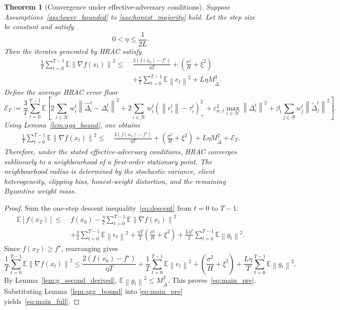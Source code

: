 \documentclass[11pt,a4paper]{article}
\newtheorem{theorem}{Theorem}
\theoremstyle{remark}
\newcommand{\E}{\mathbb{E}}
\newcommand{\HH}{\mathcal{H}}
\newcommand{\BB}{\mathcal{B}}
\newcommand{\norm}[1]{\left\lVert #1 \right\rVert}
\begin{document}
\begin{theorem}[Convergence under effective-adversary conditions]
\label{thm:main}
Suppose Assumptions~\ref{ass:lower_bounded} to \ref{ass:honest_majority} hold.
Let the step size be constant and satisfy
\begin{equation}
    0 < \eta \le \frac{1}{2L}.
    \label{eq:stepsize}
\end{equation}
Then the iterates generated by HRAC satisfy
\begin{align}
    \frac{1}{T}\sum_{t=0}^{T-1}\E\norm{\nabla f(x_t)}^2
    \le\;&
    \frac{2(f(x_0)-f^\star)}{\eta T}
    +
    \left(\frac{\sigma^2}{H}+\xi^2\right)
    \nonumber\\
    &+
    \frac{1}{T}\sum_{t=0}^{T-1}\E\norm{e_t}^2
    +
    L\eta M_{\tilde\Delta}^2.
    \label{eq:main_pre}
\end{align}
Define the average HRAC error floor
\[
    \mathcal{E}_T
    :=
    \frac{3}{T}\sum_{t=0}^{T-1}\E\!\left[
        2\sum_{i\in\HH} w_i^t \norm{\hat{\Delta}_i^t-\Delta_i^t}^2
        +2\sum_{i\in\HH} w_i^t(\norm{r_i^t}-\tau_i^t)_+^2
        +\varepsilon_{w,t}^2 \max_{i\in\HH}\norm{\Delta_i^t}^2
        +\beta_t \sum_{j\in\BB} w_j^t \norm{\tilde{\Delta}_j^t}^2
    \right].
\]
Using Lemma~\ref{lem:agg_bound}, one obtains
\begin{align}
    \frac{1}{T}\sum_{t=0}^{T-1}\E\norm{\nabla f(x_t)}^2
    \le\;&
    \frac{2(f(x_0)-f^\star)}{\eta T}
    +
    \left(\frac{\sigma^2}{H}+\xi^2\right)
    +
    L\eta M_{\tilde\Delta}^2
    +
    \mathcal{E}_T.
    \label{eq:main_full}
\end{align}
Therefore, under the stated effective-adversary conditions, HRAC converges
sublinearly to a neighbourhood of a
first-order stationary point.
The neighbourhood radius is determined by the stochastic variance,
client heterogeneity, clipping bias, honest-weight distortion, and the
remaining Byzantine weight mass.
\end{theorem}

\begin{proof}
Sum the one-step descent inequality~\eqref{eq:descent} from \(t=0\) to
\(T-1\):
\begin{align*}
    \E[f(x_T)]
    \le\;&
    f(x_0)
    -
    \frac{\eta}{2}\sum_{t=0}^{T-1}\E\norm{\nabla f(x_t)}^2
    \\
    &+
    \frac{\eta}{2}\sum_{t=0}^{T-1}\E\norm{e_t}^2
    +
    \frac{\eta T}{2}\left(\frac{\sigma^2}{H}+\xi^2\right)
    +
    \frac{L\eta^2}{2}\sum_{t=0}^{T-1}\E\norm{g_t}^2.
\end{align*}
Since \(f(x_T)\ge f^\star\), rearranging gives
\[
    \frac{1}{T}\sum_{t=0}^{T-1}\E\norm{\nabla f(x_t)}^2
    \le
    \frac{2(f(x_0)-f^\star)}{\eta T}
    +
    \frac{1}{T}\sum_{t=0}^{T-1}\E\norm{e_t}^2
    +
    \left(\frac{\sigma^2}{H}+\xi^2\right)
    +
    \frac{L\eta}{T}\sum_{t=0}^{T-1}\E\norm{g_t}^2.
\]
By Lemma~\ref{lem:g_second_derived}, \(\E\norm{g_t}^2 \le M_{\tilde\Delta}^2\).
This proves~\eqref{eq:main_pre}.
Substituting Lemma~\ref{lem:agg_bound} into \eqref{eq:main_pre}
yields~\eqref{eq:main_full}.
\end{proof}
\end{document}

